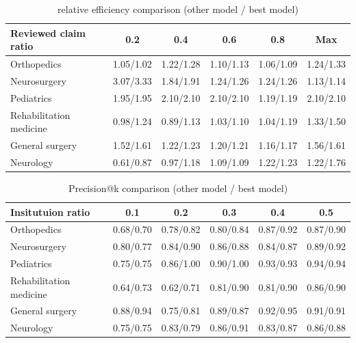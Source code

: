 \documentclass[11pt]{article}           %
\begin{document}
\begin{table}[]
    \centering
    \caption{relative efficiency comparison (other model / best model)}
    \vspace{0.5cm}
    \label{table: relative efficiency 2}
    \begin{tabular}{@{}lccccc@{}}
    \toprule
    Reviewed claim ratio    & 0.2       & 0.4       & 0.6       & 0.8       & Max       \\ \midrule
    Orthopedics             & 1.05/1.02 & 1.22/1.28 & 1.10/1.13 & 1.06/1.09 & 1.24/1.33 \\
    Neurosurgery            & 3.07/3.33 & 1.84/1.91 & 1.24/1.26 & 1.24/1.26 & 1.13/1.14 \\
    Pediatrics              & 1.95/1.95 & 2.10/2.10 & 2.10/2.10 & 1.19/1.19 & 2.10/2.10 \\
    Rehabilitation medicine & 0.98/1.24 & 0.89/1.13 & 1.03/1.10 & 1.04/1.19 & 1.33/1.50 \\
    General surgery         & 1.52/1.61 & 1.22/1.23 & 1.20/1.21 & 1.16/1.17 & 1.56/1.61 \\
    Neurology               & 0.61/0.87 & 0.97/1.18 & 1.09/1.09 & 1.22/1.23 & 1.22/1.76 \\ \bottomrule
    \end{tabular}
\end{table}

\begin{table}[]
    \centering
    \caption{Precision@k comparison (other model / best model)}
    \vspace{0.5cm}
    \label{table: precision@k 2}
    \begin{tabular}{@{}lccccc@{}}
    \toprule
    Insitutuion ratio       & 0.1       & 0.2       & 0.3       & 0.4       & 0.5       \\ \midrule
    Orthopedics             & 0.68/0.70 & 0.78/0.82 & 0.80/0.84 & 0.87/0.92 & 0.87/0.90 \\
    Neurosurgery            & 0.80/0.77 & 0.84/0.90 & 0.86/0.88 & 0.84/0.87 & 0.89/0.92 \\
    Pediatrics              & 0.75/0.75 & 0.86/1.00 & 0.90/1.00 & 0.93/0.93 & 0.94/0.94 \\
    Rehabilitation medicine & 0.64/0.73 & 0.62/0.71 & 0.81/0.90 & 0.81/0.90 & 0.86/0.90 \\
    General surgery         & 0.88/0.94 & 0.75/0.81 & 0.89/0.87 & 0.92/0.95 & 0.91/0.91 \\
    Neurology               & 0.75/0.75 & 0.83/0.79 & 0.86/0.91 & 0.83/0.87 & 0.86/0.88 \\ \bottomrule
    \end{tabular}
\end{table}
\end{document}
